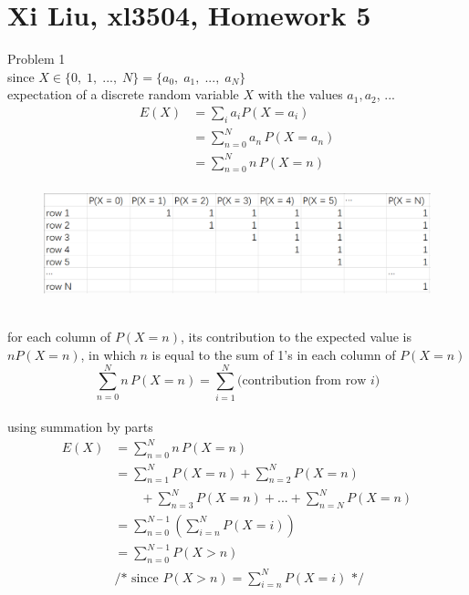 \documentclass[12pt,border=4pt,multi]{article}%
\begin{document}
\section*{Xi Liu, xl3504, Homework 5}
Problem 1\\
since $X \in \{0,\; 1,\; ...,\; N\} = \{a_0,\; a_1,\; ...,\; a_N\}$\\
expectation of a discrete random variable $X$ with the values $a_1, a_2$, ...
\begin{align*}
E(X) &= \sum_i a_i P(X = a_i)\\
&= \sum_{n = 0}^N a_n\, P(X = a_n)\\
&= \sum_{n = 0}^N n\, P(X = n)\\
\end{align*}
\begin{figure}[h!]
	\centering
	\includegraphics[width=1.1\textwidth, height=0.55\textwidth]{1} %
\end{figure}\\
for each column of $P(X = n)$, its contribution to the expected value is $n P(X = n)$, in which $n$ is equal to the sum of 1's in each column of $P(X = n)$\\
\[\sum_{n = 0}^N n\, P(X = n) = \sum_{i = 1}^N \text{(contribution from row $i$)}\]
\\
using summation by parts
\begin{align*}
E(X) &= \sum_{n = 0}^N n\, P(X = n)\\
&= \sum_{n = 1}^N P(X = n) + \sum_{n = 2}^N P(X = n)\\
&\qquad + \sum_{n = 3}^N P(X = n) + ... + \sum_{n = N}^N P(X = n)\\
&= \sum_{n = 0}^{N - 1}\left(\sum_{i = n}^N P(X = i)\right)\\
&= \sum_{n = 0}^{N - 1} P(X > n)\\
&\text{/* since } P(X > n) = \sum_{i = n}^N P(X = i) \text{ */}\\
\end{align*}
\end{document}
